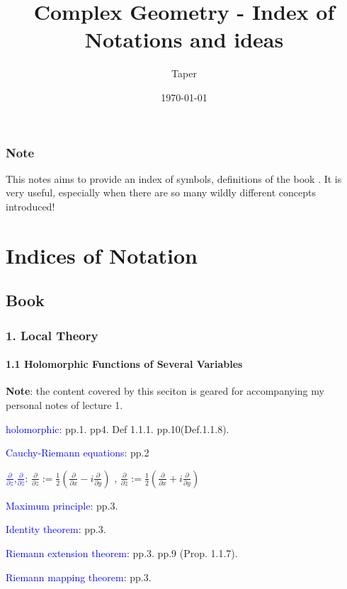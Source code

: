\documentclass{book}
\title{Complex Geometry - Index of Notations and ideas}
\date{\today}
\author{Taper}
\numberwithin{equation}{subsection} %
\theoremstyle{definition}
\begin{document}
\maketitle
\tableofcontents

\section{Note}
\label{sec:Note}
This notes aims to provide an index of symbols, definitions of the book
\cite{book}. It is very useful, especially when there are so many
wildly different concepts introduced!
\part{Indices of Notation}

\chapter{Book}
\section{1. Local Theory}
    \subsection{1.1 Holomorphic Functions of Several Variables}
    \label{sec:1.1_book}
    \textbf{Note}: the content covered by this seciton is geared for accompanying my personal notes of lecture 1.
    
    \textcolor{blue}{holomorphic}: pp.1. pp4. Def 1.1.1. pp.10(Def.1.1.8).
    
    \textcolor{blue}{Cauchy-Riemann equations}: pp.2
    
    \textcolor{blue}{$\frac{\partial}{\partial z}$,$\frac{\partial}{\partial \bar{z}}$}:
    $\frac{\partial}{\partial z}:= \frac{1}{2}
            (\frac{\partial}{\partial x} 
            -i \frac{\partial}{\partial y})
            $
    ,
    $\frac{\partial}{\partial \bar{z}}:= \frac{1}{2}
    (\frac{\partial}{\partial x} 
    + i \frac{\partial}{\partial y})
    $
    
    
    \textcolor{blue}{Maximum principle}: pp.3.
    
    \textcolor{blue}{Identity theorem}: pp.3.
    
    \textcolor{blue}{Riemann extension theorem}: pp.3. pp.9 (Prop. 1.1.7).
    
    \textcolor{blue}{Riemann mapping theorem}: pp.3.
    
\end{document}
